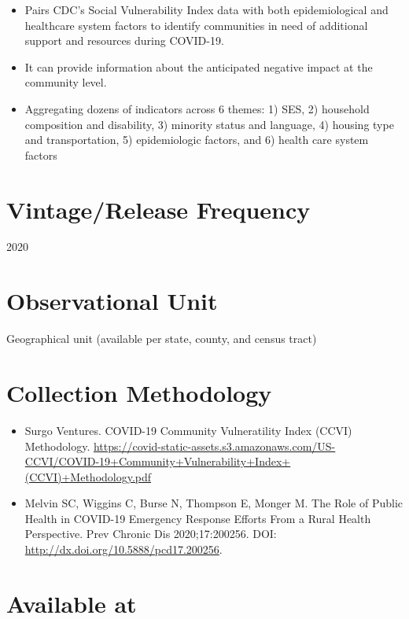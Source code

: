 \documentclass[
]{book}
\providecommand{\tightlist}{%
  \setlength{\itemsep}{0pt}\setlength{\parskip}{0pt}}
\begin{document}
\begin{itemize}
\tightlist
\item
  Pairs CDC's Social Vulnerability Index data with both epidemiological and healthcare system factors to identify communities in need of additional support and resources during COVID-19.
\item
  It can provide information about the anticipated negative impact at the community level.
\item
  Aggregating dozens of indicators across 6 themes: 1) SES, 2) household composition and disability, 3) minority status and language, 4) housing type and transportation, 5) epidemiologic factors, and 6) health care system factors
\end{itemize}

\hypertarget{vintagerelease-frequency-20}{%
\section{Vintage/Release Frequency}\label{vintagerelease-frequency-20}}

2020

\hypertarget{observational-unit-20}{%
\section{Observational Unit}\label{observational-unit-20}}

Geographical unit (available per state, county, and census tract)

\hypertarget{collection-methodology-20}{%
\section{Collection Methodology}\label{collection-methodology-20}}

\begin{itemize}
\tightlist
\item
  Surgo Ventures. COVID-19 Community Vulneratility Index (CCVI) Methodology. \url{https://covid-static-assets.s3.amazonaws.com/US-CCVI/COVID-19+Community+Vulnerability+Index+(CCVI)+Methodology.pdf}
\item
  Melvin SC, Wiggins C, Burse N, Thompson E, Monger M. The Role of Public Health in COVID-19 Emergency Response Efforts From a Rural Health Perspective. Prev Chronic Dis 2020;17:200256. DOI: \url{http://dx.doi.org/10.5888/pcd17.200256}.
\end{itemize}

\hypertarget{available-at-20}{%
\section{Available at}\label{available-at-20}}
\end{document}
